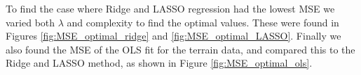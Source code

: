 \documentclass[norsk,a4paper,12pt]{article}
\begin{document}
\begin{multicols}{2}
To find the case where Ridge and LASSO regression had the lowest MSE we varied both $\lambda$ and complexity to find the optimal values. These were found in Figures \ref{fig:MSE_optimal_ridge} and \ref{fig:MSE_optimal_LASSO}. Finally we also found the MSE of the OLS fit for the terrain data, and compared this to the Ridge and LASSO method, as shown in Figure \ref{fig:MSE_optimal_ols}.




\end{multicols}
\end{document}
